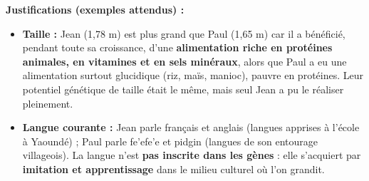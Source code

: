 \documentclass[11pt]{article}
\begin{document}
\begin{exoresolu}
\par
\textbf{Justifications (exemples attendus) :}
\begin{itemize}
    \item \textbf{Taille :} Jean (1,78 m) est plus grand que Paul (1,65 m) car il a bénéficié, pendant toute sa croissance, d'une \textbf{alimentation riche en protéines animales, en vitamines et en sels minéraux}, alors que Paul a eu une alimentation surtout glucidique (riz, maïs, manioc), pauvre en protéines. Leur potentiel génétique de taille était le même, mais seul Jean a pu le réaliser pleinement.
    \item \textbf{Langue courante :} Jean parle français et anglais (langues apprises à l'école à Yaoundé) ; Paul parle fe'efe'e et pidgin (langues de son entourage villageois). La langue n'est \textbf{pas inscrite dans les gènes} : elle s'acquiert par \textbf{imitation et apprentissage} dans le milieu culturel où l'on grandit.
\end{itemize}


\end{exoresolu}
\end{document}
